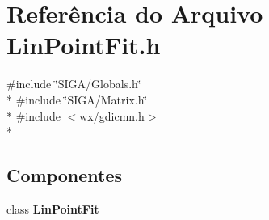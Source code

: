 \section{Referência do Arquivo Lin\+Point\+Fit.\+h}
\label{_lin_point_fit_8h}
{\ttfamily \#include \char`\"{}S\+I\+G\+A/\+Globals.\+h\char`\"{}}\\*
{\ttfamily \#include \char`\"{}S\+I\+G\+A/\+Matrix.\+h\char`\"{}}\\*
{\ttfamily \#include $<$wx/gdicmn.\+h$>$}\\*
\subsection*{Componentes}
\begin{DoxyCompactItemize}
\item 
class {\bf Lin\+Point\+Fit}
\end{DoxyCompactItemize}
